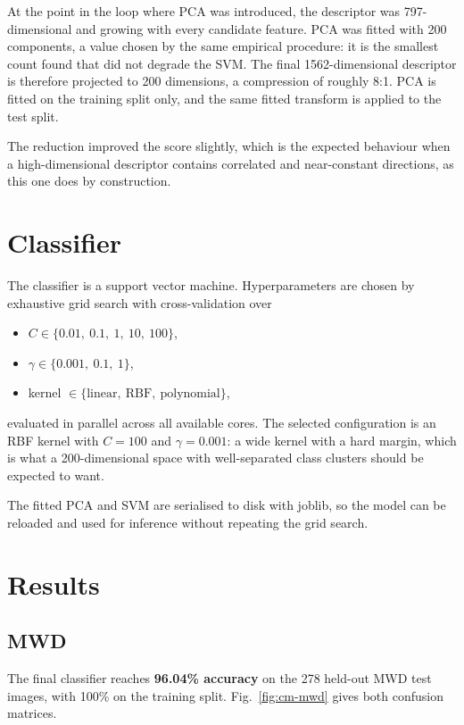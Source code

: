 \documentclass[10pt, conference, letterpaper]{IEEEtran}
\begin{document}
At the point in the loop where PCA was introduced, the descriptor was 797-dimensional and growing with every candidate feature. PCA was fitted with 200 components, a value chosen by the same empirical procedure: it is the smallest count found that did not degrade the SVM. The final 1562-dimensional descriptor is therefore projected to 200 dimensions, a compression of roughly 8:1. PCA is fitted on the training split only, and the same fitted transform is applied to the test split.

The reduction improved the score slightly, which is the expected behaviour when a high-dimensional descriptor contains correlated and near-constant directions, as this one does by construction.

\section{Classifier}

The classifier is a support vector machine. Hyperparameters are chosen by exhaustive grid search with cross-validation over

\begin{itemize}
  \item $C \in \{0.01,\ 0.1,\ 1,\ 10,\ 100\}$,
  \item $\gamma \in \{0.001,\ 0.1,\ 1\}$,
  \item kernel $\in \{\text{linear},\ \text{RBF},\ \text{polynomial}\}$,
\end{itemize}

evaluated in parallel across all available cores. The selected configuration is an RBF kernel with $C = 100$ and $\gamma = 0.001$: a wide kernel with a hard margin, which is what a 200-dimensional space with well-separated class clusters should be expected to want.

The fitted PCA and SVM are serialised to disk with joblib, so the model can be reloaded and used for inference without repeating the grid search.

\section{Results}

\subsection{MWD}

The final classifier reaches \textbf{96.04\% accuracy} on the 278 held-out MWD test images, with 100\% on the training split. Fig.~\ref{fig:cm-mwd} gives both confusion matrices.
\end{document}
